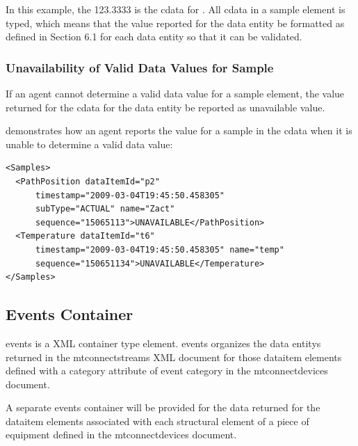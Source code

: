 \documentclass{mtconnect}	%
\begin{document}
In this example, the 123.3333 is the \gls{cdata} for .   All \gls{cdata} in a \gls{sample} element is typed, which means that the value reported for the \gls{data entity} \must be formatted as defined in Section 6.1 for each \gls{data entity} so that it can be validated.

\subsubsection{Unavailability of Valid Data Values for Sample}

If an \gls{agent} cannot determine a \gls{valid data value} for a \gls{sample} element, the value returned for the \gls{cdata} for the \gls{data entity} \must be reported as \gls{unavailable value}.

 demonstrates how an \gls{agent} reports the value for a \gls{sample} in the \gls{cdata} when it is unable to determine a \gls{valid data value}:  


\begin{lstlisting}[firstnumber=1,escapechar=|,%
    caption={Example of CDATA when Data Entity is  UNAVAILABLE},label={lst:example-of-cdata-unavailable}]
<Samples>
  <PathPosition dataItemId="p2"
      timestamp="2009-03-04T19:45:50.458305"
      subType="ACTUAL" name="Zact"
      sequence="15065113">UNAVAILABLE</PathPosition>
  <Temperature dataItemId="t6"
      timestamp="2009-03-04T19:45:50.458305" name="temp" 
      sequence="150651134">UNAVAILABLE</Temperature>
</Samples>
\end{lstlisting}

\subsection{Events Container}

\gls{events} is a XML container type element.  \gls{events} organizes the \glspl{data entity} returned in the \gls{mtconnectstreams} XML document for those \gls{dataitem} elements defined with a \gls{category} attribute of \gls{event category} in the \gls{mtconnectdevices} document.

A separate \gls{events} container will be provided for the data returned for the \gls{dataitem} elements associated with each \gls{structural element} of a piece of equipment defined in the \gls{mtconnectdevices} document.
\end{document}
